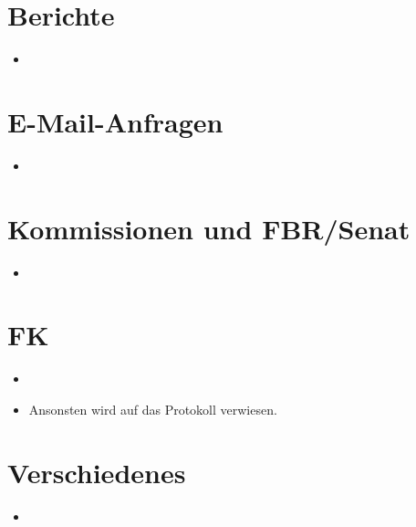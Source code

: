 

\renewcommand{\protokolldatum}{dd.mm.2014}
\renewcommand{\protokollbeginn}{hh:mm Uhr}
\renewcommand{\protokollende}{hh:mm Uhr}
\renewcommand{\protokollant}{Protokollant}
\renewcommand{\protokollanwesend}{Namen}
\renewcommand{\protokollfehlend}{Namen}


\protokolltitlepage %

\section{Berichte}
  \begin{itemize}
    \item 
  \end{itemize}

\section{E-Mail-Anfragen}
  \begin{itemize}
    \item 
  \end{itemize}

\section{Kommissionen und FBR/Senat}
  \begin{itemize}
    \item 
  \end{itemize}

\section{FK}
  \begin{itemize}
    \item 
    \item Ansonsten wird auf das Protokoll verwiesen.
  \end{itemize}

\section{Verschiedenes}
  \begin{itemize}
    \item 
  \end{itemize}



